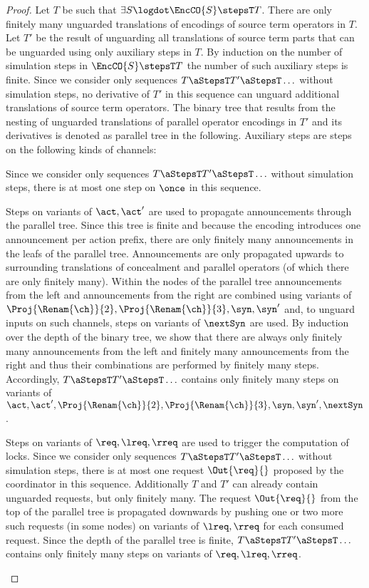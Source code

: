 \documentclass[]{eptcs}
\begin{document}
\begin{proof}
	Let $ T $ be such that $ \exists S\logdot \EncCO{S} \stepsT T $.
	There are only finitely many unguarded translations of encodings of source term operators in $ T $. Let $ T' $ be the result of unguarding all translations of source term parts that can be unguarded using only auxiliary steps in $ T $. By induction on the number of simulation steps in $ \EncCO{S} \stepsT T $ the number of such auxiliary steps is finite. Since we consider only sequences $ T \aStepsT T' \aStepsT \ldots $ without simulation steps, no derivative of $ T' $ in this sequence can unguard additional translations of source term operators. The binary tree that results from the nesting of unguarded translations of parallel operator encodings in $ T' $ and its derivatives is denoted as parallel tree in the following. Auxiliary steps are steps on the following kinds of channels:
	\begin{compactenum}
		\item Since we consider only sequences $ T \aStepsT T' \aStepsT \ldots $ without simulation steps, there is at most one step on $ \once $ in this sequence.
		\item Steps on variants of $ \act, \act' $ are used to propagate announcements through the parallel tree. Since this tree is finite and because the encoding introduces one announcement per action prefix, there are only finitely many announcements in the leafs of the parallel tree. Announcements are only propagated upwards to surrounding translations of concealment and parallel operators (of which there are only finitely many). Within the nodes of the parallel tree announcements from the left and announcements from the right are combined using variants of $ \Proj{\Renam{\ch}}{2}, \Proj{\Renam{\ch}}{3}, \syn, \syn' $ and, to unguard inputs on such channels, steps on variants of $ \nextSyn $ are used. By induction over the depth of the binary tree, we show that there are always only finitely many announcements from the left and finitely many announcements from the right and thus their combinations are performed by finitely many steps. Accordingly, $ T \aStepsT T' \aStepsT \ldots $ contains only finitely many steps on variants of $ \act, \act', \Proj{\Renam{\ch}}{2}, \Proj{\Renam{\ch}}{3}, \syn, \syn', \nextSyn $.
		\item Steps on variants of $ \req, \lreq, \rreq $ are used to trigger the computation of locks. Since we consider only sequences $ T \aStepsT T' \aStepsT \ldots $ without simulation steps, there is at most one request $ \Out{\req}{} $ proposed by the coordinator in this sequence. Additionally $ T $ and $ T' $ can already contain unguarded requests, but only finitely many. The request $ \Out{\req}{} $ from the top of the parallel tree is propagated downwards by pushing one or two more such requests (in some nodes) on variants of $ \lreq, \rreq $ for each consumed request. Since the depth of the parallel tree is finite, $ T \aStepsT T' \aStepsT \ldots $ contains only finitely many steps on variants of $ \req, \lreq, \rreq $.

\end{compactenum}
\end{proof}
\end{document}
